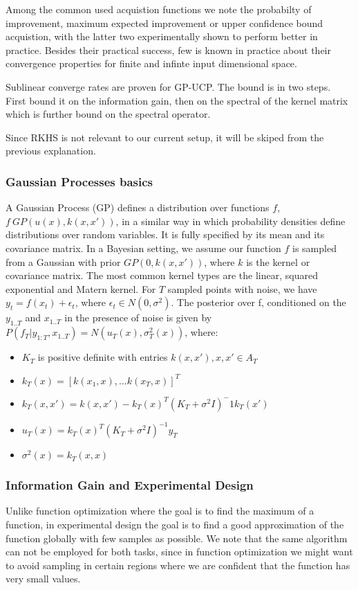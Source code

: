 \documentclass[10pt,journal,a4paper]{IEEEtran}
\begin{document}
Among the common used acquistion functions we note the probabilty of improvement, maximum expected improvement or upper confidence bound acquistion, with the latter two experimentally shown to perform better in practice. Besides their practical success, few is known in practice about their convergence properties for finite and infinte input dimensional space.

Sublinear converge rates are proven for GP-UCP. 
The bound is in two steps. First bound it on the information gain, then on the spectral of the kernel matrix which is further bound on the spectral operator.

Since RKHS is not relevant to our current setup, it will be skiped from the previous explanation.
\subsubsection{Gaussian Processes basics}
A Gaussian Process (GP) defines a distribution over functions $f$, $f ~ GP(u(x), k(x,x'))$, in a similar way in which probability densities define distributions over random variables. It is fully specified by its mean and its covariance matrix. In a Bayesian setting, we assume our function $f$ is sampled from a Gaussian with prior $GP(0, k(x,x'))$, where $k$ is the kernel or covariance matrix. The most common kernel types are the linear, squared exponential and Matern kernel.
For $T$ sampled points with noise, we have $y_t = f(x_t) + \epsilon_t$, where $\epsilon_t \in N(0,\sigma^2)$. The posterior over f, conditioned on the $y_{1..T}$ and $x_{1..T}$ in the presence of noise is given by
$P(f_T| y_{1:T},x_{1..T}) = N(u_T(x), \sigma_T^2(x))$, where: 
\begin{itemize}
	\item $K_T$ is positive definite with entries $k(x,x'), x,x' \in A_T$   
	\item $k_T(x) = [k(x_1,x),...k(x_T,x)]^T$	
	\item $k_{T}(x,x') = k(x,x') - k_T(x)^T(K_T+\sigma^2I)^-1k_T(x')$
	\item $u_{T}(x) = k_{T}(x)^{T}(K_T + \sigma^2I)^{-1} y_{T}$
	\item $\sigma^2(x) =  k_{T}(x,x)$
\end{itemize}

\subsubsection{Information Gain and Experimental Design}

Unlike function optimization where the goal is to find the maximum of a function, in experimental design the goal is to find a good approximation of the function globally with few samples as possible. We note that the same algorithm can not be employed for both tasks, since in function optimization we might want to avoid sampling in certain regions where we are confident that the function has very small values.
\end{document}
